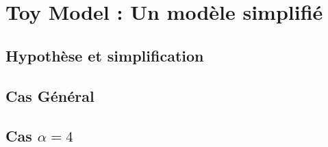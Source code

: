 \chapter{Toy Model : Un modèle simplifié}
	\minitoc

	\section{Hypothèse et simplification}
		

	\section{Cas Général}
		

	\section{Cas $\alpha  = 4$}
		

%		
%
%		

